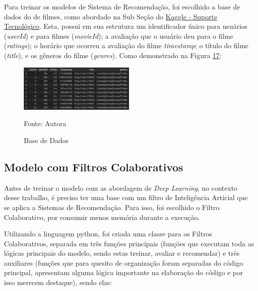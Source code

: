 Para treinar os modelos de Sistema de Recomendação, foi escolhido a base de dados do 
de filmes, como abordado na Sub Seção do \hyperref[subsec:kaggle]{Kaggle - } \hyperref[subsec:kaggle]{Suporte Tecnológico}. 
Esta, possui em sua estrutura um identificador único para usuários (\textit{userId}) e para filmes (\textit{movieId}); 
a avaliação que o usuário deu para o filme (\textit{ratings}); o horário que ocorreu a avaliação do filme 
\textit{timestamp}; o título do filme (\textit{title}), e os gêneros do filme (\textit{genres}). 
Como demonstrado na Figura \hyperref[fig:base]{17}:
\begin{figure}[htbp]
    \centering
    \caption{Base de Dados}
    \label{fig:base}
    
    \vspace{2pt} %
    
    \includegraphics[width=0.5\textwidth]{figuras/base.eps}
    
    \vspace{2pt} %
    
    \small Fonte: Autora
\end{figure}

\subsection{Modelo com Filtros Colaborativos}\label{subsec:fcolab}

Antes de treinar o modelo com as abordagem de \textit{Deep Learning}, no contexto desse trabalho, é preciso ter uma base com 
um filtro de Inteligência Articial que se aplica a Sistemas de Recomendação. Para isso, foi escolhido o Filtro Colaborativo,
por consumir menos memória durante a execução.

Utilizando a linguagem python, foi criada uma classe para os Filtros Colaborativos, separada em três funções principais 
(funções que executam toda as lógicas principais do modelo, sendo estas treinar, avaliar e recomendar) e três
auxiliares (funções que para quesito de organização foram separadas do código principal, apresentam alguma lógica 
importante na elaboração do código e por isso merecem destaque), sendo elas:

